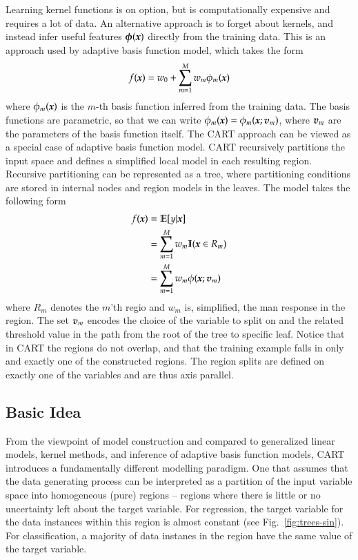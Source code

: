 \begin{refsection}
Learning kernel functions is on option, but is computationally expensive and requires a lot of data. An alternative approach is to forget about kernels, and instead infer useful features $\boldsymbol{\phi}(\boldsymbol{x})$ directly from the training data. This is an approach used by adaptive basis function model, which takes the form
$$ f(\boldsymbol{x})=w_0+\sum_{m=1}^{M} w_m\phi_m(\boldsymbol{x}) $$
where $\phi_m(\boldsymbol{x})$ is the $m$-th basis function inferred from the training data. The basis functions are parametric, so that we can write $\phi_m(\boldsymbol{x})=\phi_m(\boldsymbol{x};\boldsymbol{v}_m)$, where $\boldsymbol{v}_m$ are the parameters of the basis function itself. The CART approach can be viewed as a special case of adaptive basis function model. CART recursively partitions the input space and defines a simplified local model in each resulting region. Recursive partitioning can be represented as a tree, where partitioning conditions are stored in internal nodes and region models in the leaves. The model takes the following form
\begin{align}
f(\boldsymbol{x}) & = \mathbb{E}[y|\boldsymbol{x}] \\
 & = \sum_{m=1}^M w_m \mathbb{I}(\boldsymbol{x}\in R_m) \\
 & = \sum_{m=1}^M w_m\phi(\boldsymbol{x};\boldsymbol{v}_m)
\end{align}
where $R_m$ denotes the $m$'th regio and $w_m$ is, simplified, the man response in the region. The set $\boldsymbol{v}_m$ encodes the choice of the variable to split on and the related threshold value in the path from the root of the tree to specific leaf. Notice that in CART the regions do not overlap, and that the training example falls in only and exactly one of the constructed regions. The region splits are defined on exactly one of the variables and are thus axis parallel.

\subsection*{Basic Idea}

From the viewpoint of model construction and compared to generalized linear models, kernel methods, and inference of adaptive basis function models, CART introduces a fundamentally different modelling paradigm. One that assumes that the data generating process can be interpreted as a partition of the input variable space into homogeneous (pure) regions -- regions where there is little or no uncertainty left about the target variable. For regression, the target variable for the data instances within this region is almost constant (see Fig.~\ref{fig:trees-sin}). For classification, a majority of data instanes in the region have the same value of the target variable.


\end{refsection}
